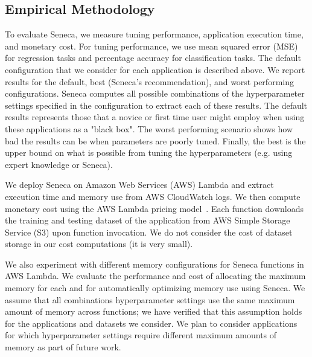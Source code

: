 
\subsection{Empirical Methodology}
To evaluate Seneca, we measure tuning performance, application execution time, and monetary cost.
For tuning performance, we use mean squared error (MSE) for regression tasks 
and percentage accuracy for
classification tasks. The default configuration that we 
consider for each application is described above.
We report results for the default, best (Seneca's recommendation), 
and worst performing configurations.  Seneca computes all possible combinations 
of the hyperparameter settings specified in the configuration to extract each of these results.
The default results represents those that a novice or first time 
user might employ when using these applications
as a "black box".  The worst performing scenario shows how bad the results can be
when parameters are poorly tuned.  Finally, the best is the upper bound on what is possible from 
tuning the hyperparameters (e.g. using expert knowledge or Seneca). 

We deploy Seneca on Amazon Web Services (AWS) Lambda and extract
execution time and memory use from AWS CloudWatch logs.  We then compute monetary cost
using the AWS Lambda pricing model~\cite{ref:pricing}.
Each function downloads the training and testing dataset 
of the application from AWS Simple Storage Service (S3) upon function invocation. 
We do not consider the cost of dataset storage in our cost computations (it is very small).

We also experiment with different memory configurations for Seneca functions in AWS Lambda.  
We evaluate
the performance and cost of allocating the maximum memory for each and for automatically optimizing 
memory use using Seneca. We assume that all combinations hyperparameter settings use the 
same maximum amount of memory across functions; we 
have verified that this assumption holds for the applications and datasets we consider.
We plan to consider applications for which hyperparameter settings require 
different maximum amounts of memory as part of future work.  


